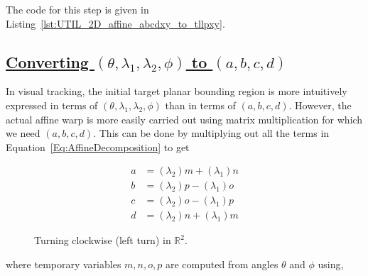 The code for this step is given in Listing~\ref{lst:UTIL_2D_affine_abcdxy_to_tllpxy}.

\subsection{\underline{Converting  $(\theta, \lambda_1, \lambda_2, \phi)$ to $(a, b, c, d)$}}
In visual tracking, the initial target planar bounding region is more intuitively expressed in terms of $(\theta, \lambda_1, \lambda_2, \phi)$ than in terms of $(a, b, c, d)$.  However, the actual affine warp is more easily carried out using matrix multiplication for which we need $(a, b, c, d)$.  This can be done by multiplying out all the terms in Equation~\ref{Eq:AffineDecomposition} to get

\begin{equation}
\boxed{
\begin{array}{llll}
a &= (\lambda_2) m + (\lambda_1) n\\
b &= (\lambda_2) p  - (\lambda_1) o \\
c &= (\lambda_2) o  - (\lambda_1) p \\
d &= (\lambda_2) n +(\lambda_1) m
\end{array}}
\label{Eqn:tllpxy_to_abcdxy}
\end{equation}

								\begin{figure}
								\centering
								\caption{Turning clockwise (left turn) in $\mathbb{R}^2$.}
								\label{fig:left_turn}
								\end{figure}



where temporary variables $m, n, o, p$ are computed from angles $\theta$ and $\phi$ using,

